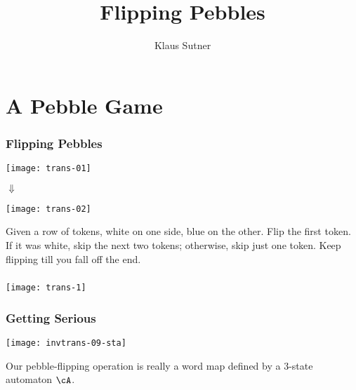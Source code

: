 \documentclass[handout,10pt]{ksbeamer}
\title{Flipping Pebbles}
\author[K. Sutner]{Klaus Sutner}
\institute{Carnegie Mellon University}
\date{}
\begin{document}
\frame{\titlepage}


\section{A Pebble Game}
\frame{\tableofcontents[current]}


\begin{frame} 
\frametitle{Flipping  Pebbles}
  

\begin{center}
  \texttt{[image: trans-01]}
\end{center}

\begin{center}
  {\LARGE\textbf{$\Downarrow$}}
\end{center}

\begin{center}
  \texttt{[image: trans-02]}
\end{center}
\vspace{4ex} 

\begin{graywidthbox}{0.9}
Given a row of tokens, white on one side, blue on the other. 
Flip the first token.  If it was white,
  skip the next two tokens; otherwise, skip just one token. 
Keep flipping till you fall off the end.
\end{graywidthbox}

\end{frame}


\begin{frame} 
\frametitle{}
  
\begin{center}
  \texttt{[image: trans-1]}
\end{center}


\end{frame}

\begin{frame}
\frametitle{Getting Serious}

\begin{center}
\texttt{[image: invtrans-09-sta]}
\end{center}

Our pebble-flipping operation is really a word map defined by a 3-state 
automaton  $\cA$.


\end{frame}
\end{document}
